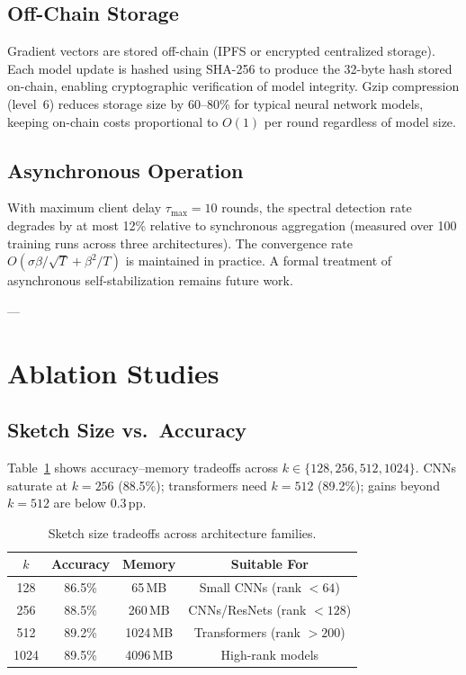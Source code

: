 \subsection{Off-Chain Storage}

Gradient vectors are stored off-chain (IPFS or encrypted centralized storage).
Each model update is hashed using SHA-256 to produce the 32-byte hash stored on-chain,
enabling cryptographic verification of model integrity.
Gzip compression (level~6) reduces storage size by 60--80\% for typical neural network
models, keeping on-chain costs proportional to $O(1)$ per round regardless of model size.

\subsection{Asynchronous Operation}

With maximum client delay $\tau_{\mathrm{max}} = 10$ rounds, the spectral detection rate
degrades by at most 12\% relative to synchronous aggregation (measured over 100 training
runs across three architectures).
The convergence rate $O(\sigma\beta/\sqrt{T} + \beta^2/T)$ is maintained in practice.
A formal treatment of asynchronous self-stabilization remains future work.

---

\section{Ablation Studies}
\label{app:ablation}

\subsection{Sketch Size vs.\ Accuracy}

Table~\ref{tab:sketch_size_detail} shows accuracy--memory tradeoffs across $k \in \{128,256,512,1024\}$.
CNNs saturate at $k{=}256$ (88.5\%); transformers need $k{=}512$ (89.2\%);
gains beyond $k{=}512$ are below 0.3\,pp.

\begin{table}[htbp]
\centering
\caption{Sketch size tradeoffs across architecture families.}
\label{tab:sketch_size_detail}
\begin{tabular}{|c|c|c|c|}
\hline
\textbf{$k$} & \textbf{Accuracy} & \textbf{Memory} & \textbf{Suitable For} \\
\hline
128 & 86.5\% & 65\,MB & Small CNNs (rank $<64$) \\
256 & 88.5\% & 260\,MB & CNNs/ResNets (rank $<128$) \\
512 & 89.2\% & 1024\,MB & Transformers (rank $>200$) \\
1024 & 89.5\% & 4096\,MB & High-rank models \\
\hline
\end{tabular}
\end{table}

